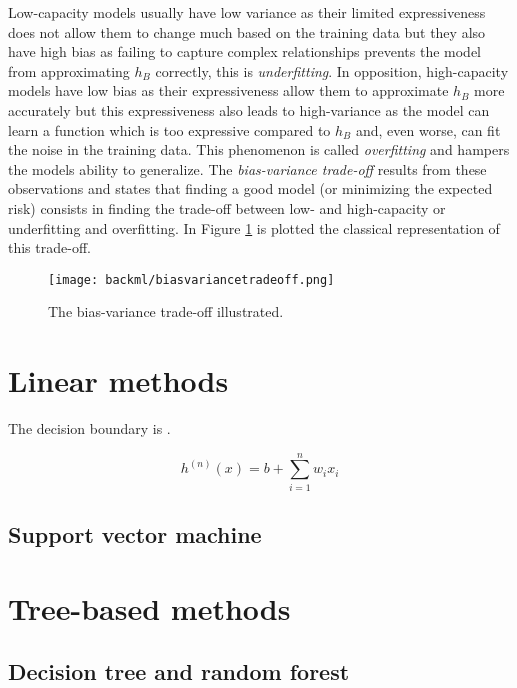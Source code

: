 Low-capacity models usually have low variance as their limited expressiveness does not allow them to change much based on the training data but they also have high bias as failing to capture complex relationships prevents the model from approximating $h_B$ correctly, this is \textit{underfitting}. In opposition, high-capacity models have low bias as their expressiveness allow them to approximate $h_B$ more accurately but this expressiveness also leads to high-variance as the model can learn a function which is too expressive compared to $h_B$ and, even worse, can fit the noise in the training data. This phenomenon is called \textit{overfitting} and hampers the models ability to generalize. The \textit{bias-variance trade-off} results from these observations and states that finding a good model (or minimizing the expected risk) consists in finding the trade-off between low- and high-capacity or underfitting and overfitting. In Figure \ref{fig:backml:biasvariancetradeoff} is plotted the classical representation of this trade-off.  


\begin{figure}
  \centering
  \texttt{[image: backml/biasvariancetradeoff.png]}
  \caption{The bias-variance trade-off illustrated.}
  \label{fig:backml:biasvariancetradeoff}
\end{figure}



\section{Linear methods}

The decision boundary is . 

\begin{equation}
h^(n)(x) = b + \sum_{i=1}^n w_i x_i 
\end{equation} 

\subsection{Support vector machine}

\section{Tree-based methods}
\label{sec:backml:treebased}

\subsection{Decision tree and random forest}

